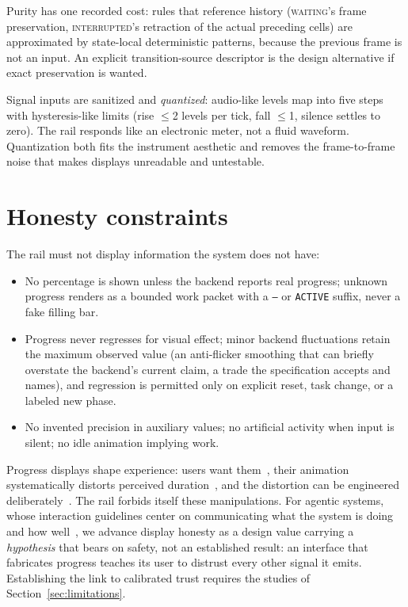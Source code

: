 \documentclass[11pt]{article}
\newcommand{\railstate}[1]{\textsc{#1}}
\begin{document}
Purity has one recorded cost: rules that reference history (\railstate{waiting}'s frame preservation, \railstate{interrupted}'s retraction of the actual preceding cells) are approximated by
state-local deterministic patterns, because the previous frame is not an
input. An explicit transition-source descriptor is the design
alternative if exact preservation is wanted.

Signal inputs are sanitized and \emph{quantized}: audio-like levels map
into five steps with hysteresis-like limits (rise $\leq$2 levels per
tick, fall $\leq$1, silence settles to zero). The rail responds like an
electronic meter, not a fluid waveform. Quantization both fits the instrument aesthetic and removes the frame-to-frame noise that makes displays
unreadable and untestable.

\section{Honesty constraints}
\label{sec:honesty}

The rail must not display information the system does not have:

\begin{itemize}
\item No percentage is shown unless the backend reports real progress;
unknown progress renders as a bounded work packet with a \texttt{--} or
\texttt{ACTIVE} suffix, never a fake filling bar.
\item Progress never regresses for visual effect; minor backend
fluctuations retain the maximum observed value (an anti-flicker smoothing that can briefly overstate the backend's current claim, a trade the specification accepts and names), and regression is permitted
only on explicit reset, task change, or a labeled new phase.
\item No invented precision in auxiliary values; no artificial activity
when input is silent; no idle animation implying work.
\end{itemize}

Progress displays shape experience: users want
them~\cite{myers1985}, their animation systematically distorts perceived
duration~\cite{harrison2007}, and the distortion can be engineered
deliberately~\cite{harrison2010}. The rail forbids itself these manipulations. For agentic
systems, whose interaction guidelines center on communicating what the
system is doing and how well~\cite{amershi2019}, we advance display honesty as a design value carrying a \emph{hypothesis} that bears on safety, not an established result: an interface that
fabricates progress teaches its user to distrust every other signal it
emits. Establishing the link to calibrated trust requires the studies of
Section~\ref{sec:limitations}.
\end{document}
